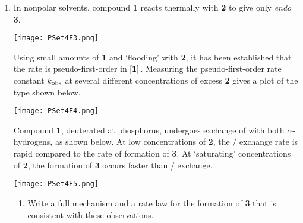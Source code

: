 \documentclass[../psets.tex]{subfiles}
\begin{document}
\begin{enumerate}
\begin{enumerate}
\begin{proof}
\begin{align*}
                \left( \frac{1}{273+60},\ln(10) \right)&&
                \left( \frac{1}{273+110},\ln(\num{500000}) \right)
            \end{align*}
            has slope $m=-27600$ and $y$-intercept $b=85.18$, so $\Delta H^\ddagger_\text{rel}=54.6$ and $\Delta S^\ddagger_\text{rel}=0.169$.\par
            It follows that the reaction in DMF --- which proceeds via the stepwise mechanism, per part (b) --- has both a higher enthalpy and entropy of activation. It makes sense that it should have a higher enthalpy of activation since the RDS involves the formation of a high-energy carbocation intermediate. It also makes sense that it should have a higher entropy of activation because the introduction of charged species into a polar aprotic solvent will disrupt the random bonding of the solvent to itself and introduce highly ordered ion cages.
        \end{proof}
    \end{enumerate}
    \pagebreak
    \item In nonpolar solvents, compound \textbf{1} reacts thermally with \textbf{2} to give only \emph{endo} \textbf{3}.
    \begin{center}
        \texttt{[image: PSet4F3.png]}
    \end{center}
    Using small amounts of \textbf{1} and `flooding' with \textbf{2}, it has been established that the rate is pseudo-first-order in $\cnc{\textbf{1}}$. Measuring the pseudo-first-order rate constant $k_\textup{obs}$ at several different concentrations of excess \textbf{2} gives a plot of the type shown below.
    \begin{center}
        \texttt{[image: PSet4F4.png]}
    \end{center}
    Compound \textbf{1}, deuterated at phosphorus, undergoes exchange of  with both $\alpha$-hydrogens, as shown below. At low concentrations of \textbf{2}, the / exchange rate is rapid compared to the rate of formation of \textbf{3}. At `saturating' concentrations of \textbf{2}, the formation of \textbf{3} occurs faster than / exchange.
    \begin{center}
        \texttt{[image: PSet4F5.png]}
    \end{center}
    \begin{enumerate}
        \item Write a full mechanism and a rate law for the formation of \textbf{3} that is consistent with these observations.

\end{enumerate}
\end{enumerate}
\end{document}
